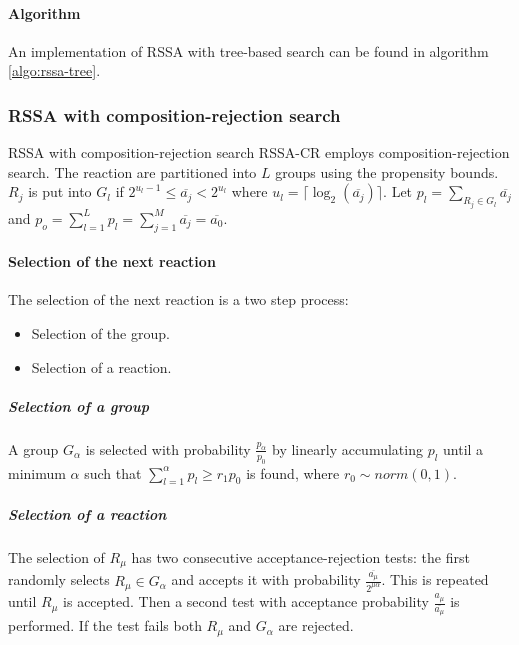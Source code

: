       \paragraph{Algorithm}
      An implementation of RSSA with tree-based search can be found in algorithm \ref{algo:rssa-tree}.

      

    \subsubsection{RSSA with composition-rejection search}
    RSSA with composition-rejection search RSSA-CR employs composition-rejection search.
    The reaction are partitioned into $L$ groups using the propensity bounds.
    $R_j$ is put into $G_l$ if $2^{u_l-1}\le\overline{a_j}< 2^{u_l}$ where $u_l = \lceil\log_2(\overline{a_j})\rceil$.
    Let $p_l = \sum\limits_{R_j\in G_l}\overline{a_j}$ and $p_o = \sum\limits_{l=1}^Lp_l = \sum\limits_{j=1}^M\overline{a_j} = \overline{a_0}$.

      \paragraph{Selection of the next reaction}
      The selection of the next reaction is a two step process:

      \begin{multicols}{2}
        \begin{itemize}
          \item Selection of the group.
          \item Selection of a reaction.
        \end{itemize}
      \end{multicols}

        \subparagraph{Selection of a group}
        A group $G_\alpha$ is selected with probability $\frac{p_\alpha}{p_0}$ by linearly accumulating $p_l$ until a minimum $\alpha$ such that $\sum\limits_{l=1}^\alpha p_l\ge r_1p_0$ is found, where $r_0\sim norm(0,1)$.

        \subparagraph{Selection of a reaction}
        The selection of $R_\mu$ has two consecutive acceptance-rejection tests: the first randomly selects $R_\mu\in G_\alpha$ and accepts it with probability $\frac{\overline{a_\mu}}{2^{\mu\alpha}}$.
        This is repeated until $R_\mu$ is accepted.
        Then a second test with acceptance probability $\frac{a_\mu}{\overline{a_\mu}}$ is performed.
        If the test fails both $R_\mu$ and $G_\alpha$ are rejected.

